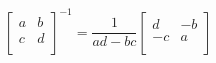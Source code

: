    \begin{center}
        \begin{equation*}
            \begin{bmatrix}
                a & b \\
                c & d \\
            \end{bmatrix}^{-1}
            = \frac{1}{ad-bc}
            \begin{bmatrix}
            d  & -b \\
            -c & a  \\
            \end{bmatrix}
        \end{equation*}
    \end{center}
